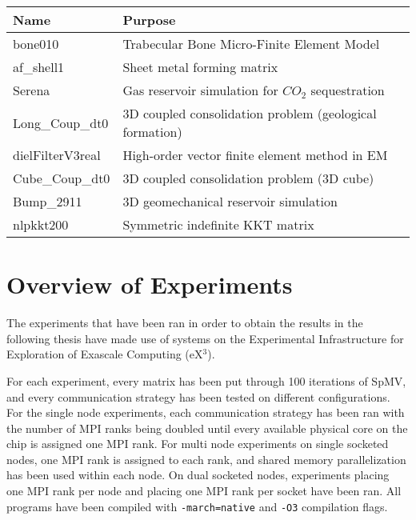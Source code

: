 \begin{table}[H]
\begin{center}
\begin{tabular}[c]{|l|l|}
\hline
\textbf{Name}&\textbf{Purpose}  \\
\hline
bone010&Trabecular Bone Micro-Finite Element Model\\
\hline
af\_shell1&Sheet metal forming matrix\\
\hline
Serena&Gas reservoir simulation for \(CO_{2}\) sequestration\\
\hline
Long\_Coup\_dt0&3D coupled consolidation problem (geological formation)\\
\hline
dielFilterV3real&High-order vector finite element method in EM\\
\hline
Cube\_Coup\_dt0&3D coupled consolidation problem (3D cube)\\
\hline
Bump\_2911&3D geomechanical reservoir simulation\\
\hline
nlpkkt200&Symmetric indefinite KKT matrix\\
\hline
\end{tabular}
\end{center}
\end{table}


\section{Overview of Experiments}
The experiments that have been ran in order to obtain the results in the following thesis have made use of systems on the Experimental Infrastructure for Exploration of Exascale Computing (eX\(^{3}\)).
\medskip

For each experiment, every matrix has been put through 100 iterations of SpMV, and every communication strategy has been tested on different configurations. For the single node experiments, each communication strategy has been ran with the number of MPI ranks being doubled until every available physical core on the chip is assigned one MPI rank. For multi node experiments on single socketed nodes, one MPI rank is assigned to each rank, and shared memory parallelization has been used within each node. On dual socketed nodes, experiments placing one MPI rank per node and placing one MPI rank per socket have been ran. All programs have been compiled with \texttt{-march=native} and \texttt{-O3} compilation flags.

